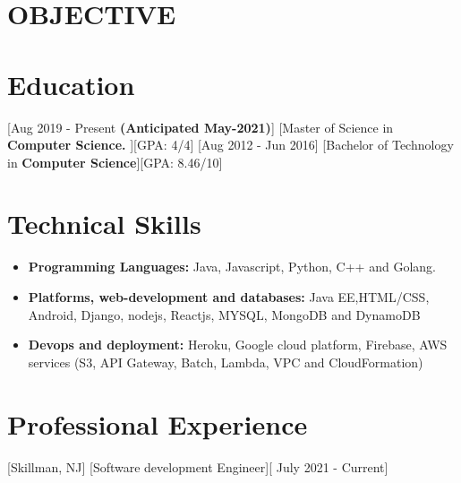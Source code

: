 \documentclass{article}
\begin{document}

\makecvtitle %
\section{OBJECTIVE}
\section{Education}
[\normalfont{}Aug 2019 - Present \textbf{(Anticipated May-2021)}]
[\normalfont{}Master of Science in \textbf{Computer Science. }][GPA: 4/4]
\vspace{0.1cm}
[\normalfont{}Aug 2012 - Jun 2016]
[\normalfont{}Bachelor of Technology in \textbf{Computer Science}][GPA: 8.46/10]
\vspace{0.5cm}
\section{Technical Skills}
\begin{itemize}
\item \textbf{Programming Languages:} Java, Javascript, Python, C++ and Golang.
\item \textbf{Platforms, web-development and databases:} Java EE,HTML/CSS, Android, Django, nodejs, Reactjs, MYSQL, MongoDB and DynamoDB
\item \textbf{Devops and deployment:} Heroku, Google cloud platform, Firebase, AWS services (S3, API Gateway, Batch, Lambda, VPC and CloudFormation)
\end{itemize}
 
\vspace{0.5cm}
\section{Professional Experience}

[\normalfont{}Skillman, NJ]
[Software development Engineer][\normalfont{} July 2021 - Current]
\vspace{0.25cm}
\end{document}
